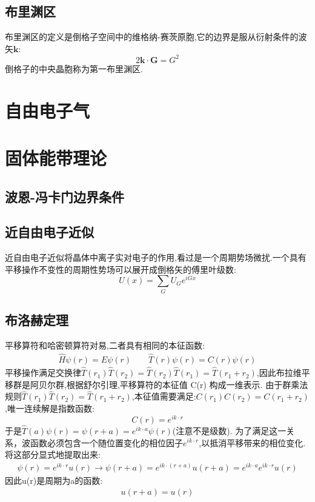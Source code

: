 \subsection{布里渊区}
布里渊区的定义是倒格子空间中的维格纳-赛茨原胞,它的边界是服从衍射条件的波矢$\mathbf{k}$:
\begin{equation}
    2\mathbf{k}\cdot\mathbf{G}=G^2
\end{equation}
倒格子的中央晶胞称为第一布里渊区.
\section{自由电子气}
\section{固体能带理论}
\subsection{波恩-冯卡门边界条件}
\subsection{近自由电子近似}
近自由电子近似将晶体中离子实对电子的作用,看过是一个周期势场微扰.一个具有平移操作不变性的周期性势场可以展开成倒格矢的傅里叶级数:
\begin{equation}
    U(x)=\sum_G U_Ge^{iGx}
\end{equation}
\subsection{布洛赫定理}
平移算符和哈密顿算符对易,二者具有相同的本征函数:
\begin{align}
    \hat{H}\psi(r)=E\psi(r) \qquad \hat{T}(r)\psi(r)=C(r)\psi(r)
\end{align}
平移操作满足交换律$\hat{T}(r_1)\hat{T}(r_2)=\hat{T}(r_2)\hat{T}(r_1)=\hat{T}(r_1+r_2)$,因此布拉维平移群是阿贝尔群,根据舒尔引理,平移算符的本征值 C(r) 构成一维表示.
由于群乘法规则$\hat{T}(r_1)\hat{T}(r_2)=\hat{T}(r_1+r_2)$,本征值需要满足:$C(r_1)C(r_2)=C(r_1+r_2)$,唯一连续解是指数函数:
\begin{equation}
    C(r)=e^{ik\cdot r}
\end{equation}
于是$\hat{T}(a)\psi(r)=\psi(r+a)=e^{ik\cdot a}\psi(r)$(注意不是级数).
为了满足这一关系，波函数必须包含一个随位置变化的相位因子$e^{ik\cdot r}$,以抵消平移带来的相位变化.将这部分显式地提取出来:
\begin{gather}
    \psi(r)=e^{ik\cdot r}u(r)\rightarrow
    \psi(r+a)=e^{ik\cdot(r+a)}u(r+a)=e^{ik\cdot a}e^{ik\cdot r}u(r)
\end{gather}
因此u(r)是周期为a的函数:
\begin{gather}
    u(r+a)=u(r)
\end{gather}
